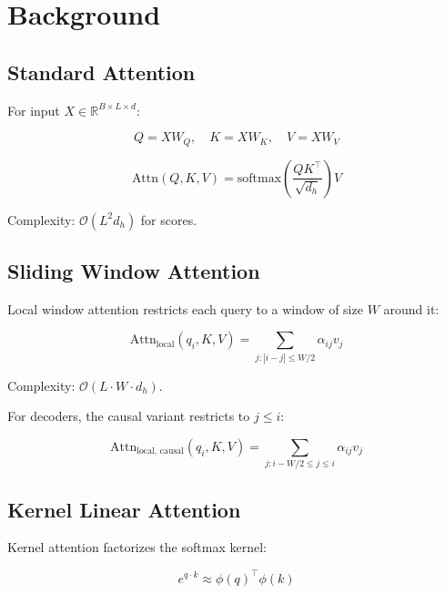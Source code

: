 \section{Background}

\subsection{Standard Attention}

For input $X \in \mathbb{R}^{B \times L \times d}$:

\begin{equation}
Q = X W_Q, \quad K = X W_K, \quad V = X W_V
\end{equation}

\begin{equation}
\text{Attn}(Q, K, V) = \text{softmax}\!\left(\frac{Q K^\top}{\sqrt{d_h}}\right) V
\end{equation}

Complexity: $\mathcal{O}(L^2 d_h)$ for scores.

\subsection{Sliding Window Attention}

Local window attention restricts each query to a window of size $W$ around 
it:

\begin{equation}
\text{Attn}_\text{local}(q_i, K, V) = \sum_{j : |i - j| \leq W/2} \alpha_{ij} v_j
\end{equation}

Complexity: $\mathcal{O}(L \cdot W \cdot d_h)$.

For decoders, the causal variant restricts to $j \leq i$:

\begin{equation}
\text{Attn}_\text{local, causal}(q_i, K, V) = \sum_{j : i - W/2 \leq j \leq i} \alpha_{ij} v_j
\end{equation}

\subsection{Kernel Linear Attention}

Kernel attention factorizes the softmax kernel:

\begin{equation}
e^{q \cdot k} \approx \phi(q)^\top \phi(k)
\end{equation}

